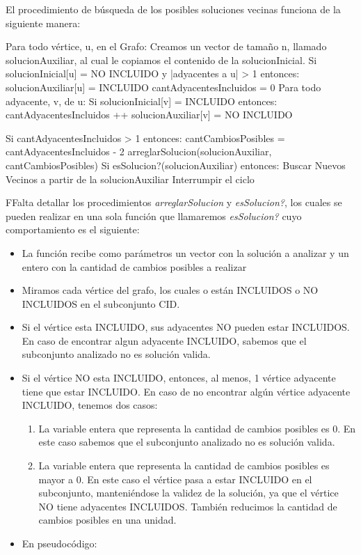 El procedimiento de búsqueda de los posibles soluciones vecinas funciona de la siguiente manera:
\medskip

\begin{codesnippet}
Para todo vértice, u, en el Grafo:
  Creamos un vector de tamaño n, llamado solucionAuxiliar, al cual le copiamos
  el contenido de la solucionInicial.
  Si solucionInicial[u] = NO INCLUIDO y |adyacentes a u| > 1 entonces:
     solucionAuxiliar[u] = INCLUIDO
     cantAdyacentesIncluidos = 0
     Para todo adyacente, v, de u:
         Si solucionInicial[v] = INCLUIDO entonces:
             cantAdyacentesIncluidos ++
             solucionAuxiliar[v] = NO INCLUIDO

  Si cantAdyacentesIncluidos > 1 entonces:
     cantCambiosPosibles = cantAdyacentesIncluidos - 2
     arreglarSolucion(solucionAuxiliar, cantCambiosPosibles)
     Si esSolucion?(solucionAuxiliar) entonces:
       Buscar Nuevos Vecinos a partir de la solucionAuxiliar
       Interrumpir el ciclo
\end{codesnippet}

FFalta detallar los procedimientos \textit{arreglarSolucion} y \textit{esSolucion?}, los cuales se pueden realizar en una sola función que llamaremos \textit{esSolucion?} cuyo comportamiento es el siguiente:
\begin{itemize}
	\item La función recibe como parámetros un vector con la solución a analizar y un entero con la cantidad de cambios posibles a realizar
	\item Miramos cada vértice del grafo, los cuales o están INCLUIDOS o NO INCLUIDOS en el subconjunto CID.
    \item Si el vértice esta INCLUIDO, sus adyacentes NO pueden estar INCLUIDOS. En caso de encontrar algun adyacente INCLUIDO, sabemos que el subconjunto analizado no es solución valida.
    \item Si el vértice NO esta INCLUIDO, entonces, al menos, 1 vértice adyacente tiene que estar INCLUIDO. En caso de no encontrar algún vértice adyacente INCLUIDO, tenemos dos casos:
    \begin{enumerate}
    	\item La variable entera que representa la cantidad de cambios posibles es 0. En este caso sabemos que el subconjunto analizado no es solución valida.
        \item La variable entera que representa la cantidad de cambios posibles es mayor a 0. En este caso el vértice pasa a estar INCLUIDO en el subconjunto, manteniéndose la validez de la solución, ya que el vértice NO tiene adyacentes INCLUIDOS. También reducimos la cantidad de cambios posibles en una unidad.
    \end{enumerate}

    \item En pseudocódigo:

\end{itemize}

